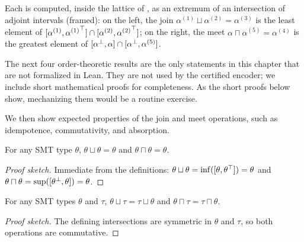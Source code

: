 \begin{example}
\begin{center}
  \end{center}
  Each is computed, inside the lattice of , as an extremum of an intersection of adjoint intervals (framed): on the left, the join $\alpha^{(1)} \sqcup \alpha^{(2)} = \alpha^{(3)}$ is the least element of $[\alpha^{(1)},{\alpha^{(1)}}^{\top}] \cap [\alpha^{(2)},{\alpha^{(2)}}^{\top}]$; on the right, the meet $\alpha \sqcap \alpha^{(5)} = \alpha^{(4)}$ is the greatest element of $[{\alpha}^{\bot},\alpha] \cap [{\alpha}^{\bot},\alpha^{(5)}]$.
\end{example}

\begin{note}
The next four order-theoretic results are the only statements in this chapter that are not formalized in Lean. They are not used by the certified encoder; we include short mathematical proofs for completeness. As the short proofs below show, mechanizing them would be a routine exercise.
\end{note}

We then show expected properties of the join and meet operations, such as idempotence, commutativity, and absorption.

\begin{lemma}[Idempotence]
  For any SMT type $\theta$, $\theta \sqcup \theta = \theta$ and $\theta \sqcap \theta = \theta$.
\end{lemma}
\begin{proof}[Proof sketch]
Immediate from the definitions: $\theta \sqcup \theta = \inf([\theta, {\theta}^{\top}]) = \theta$ and $\theta \sqcap \theta = \sup([{\theta}^{\bot}, \theta]) = \theta$.
\end{proof}

\begin{lemma}[Commutativity]
  For any SMT types $\theta$ and $\tau$, $\theta \sqcup \tau = \tau \sqcup \theta$ and $\theta \sqcap \tau = \tau \sqcap \theta$.
\end{lemma}
\begin{proof}[Proof sketch]
The defining intersections are symmetric in $\theta$ and $\tau$, so both operations are commutative.
\end{proof}

